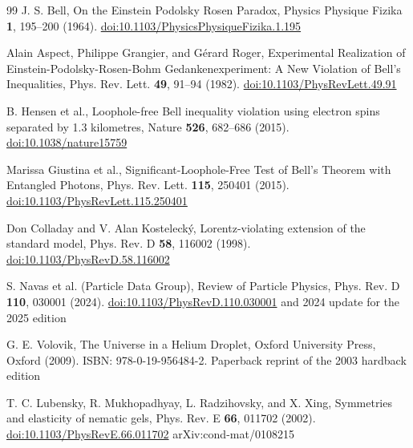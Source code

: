\documentclass[smallextended]{svjour3}       %
\begin{document}
\begin{thebibliography}{99}
        J. S. Bell,
        On the Einstein Podolsky Rosen Paradox,
        Physics Physique Fizika \textbf{1}, 195--200 (1964).
        \href{https://doi.org/10.1103/PhysicsPhysiqueFizika.1.195}{doi:10.1103/PhysicsPhysiqueFizika.1.195}

        Alain Aspect, Philippe Grangier, and Gérard Roger,
        Experimental Realization of Einstein-Podolsky-Rosen-Bohm Gedankenexperiment: A New Violation of Bell's Inequalities,
        Phys. Rev. Lett. \textbf{49}, 91--94 (1982).
        \href{https://doi.org/10.1103/PhysRevLett.49.91}{doi:10.1103/PhysRevLett.49.91}

        B. Hensen et al.,
        Loophole-free Bell inequality violation using electron spins separated by 1.3 kilometres,
        Nature \textbf{526}, 682--686 (2015).
        \href{https://doi.org/10.1038/nature15759}{doi:10.1038/nature15759}

        Marissa Giustina et al.,
        Significant-Loophole-Free Test of Bell’s Theorem with Entangled Photons,
        Phys. Rev. Lett. \textbf{115}, 250401 (2015).
        \href{https://doi.org/10.1103/PhysRevLett.115.250401}{doi:10.1103/PhysRevLett.115.250401}

        Don Colladay and V. Alan Kosteleck{\'y},
        Lorentz-violating extension of the standard model,
        Phys. Rev. D \textbf{58}, 116002 (1998).
        \href{https://doi.org/10.1103/PhysRevD.58.116002}{doi:10.1103/PhysRevD.58.116002}

        S. Navas et al. (Particle Data Group),
        Review of Particle Physics,
        Phys. Rev. D \textbf{110}, 030001 (2024).
        \href{https://doi.org/10.1103/PhysRevD.110.030001}{doi:10.1103/PhysRevD.110.030001}
        and 2024 update for the 2025 edition

        G. E. Volovik,
        The Universe in a Helium Droplet,
        Oxford University Press, Oxford (2009).
        ISBN: 978-0-19-956484-2.
        Paperback reprint of the 2003 hardback edition

        T. C. Lubensky, R. Mukhopadhyay, L. Radzihovsky, and X. Xing,
        Symmetries and elasticity of nematic gels,
        Phys. Rev. E \textbf{66}, 011702 (2002).
        \href{https://doi.org/10.1103/PhysRevE.66.011702}{doi:10.1103/PhysRevE.66.011702}
        arXiv:cond-mat/0108215


\end{thebibliography}
\end{document}
